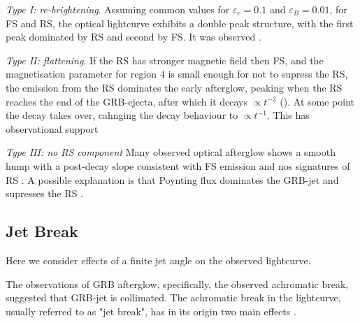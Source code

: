 \textit{Type I: re-brightening}. Assuming common values for $\varepsilon_e=0.1$ and $\varepsilon_B=0.01$, for FS and RS, the optical lightcurve exhibits a double peak structure, with the first peak dominated by RS and second by FS. It was observed \citep{Kobayashi and Zhang, 2003b; Shao and Dai, 2005}. 

\textit{Type II: flattening}. If the RS has stronger magnetic field then FS, and the magnetisation parameter for region $4$ is small enough for not to supress the RS, the emission from the RS dominates the early afterglow, peaking when the RS reaches the end of the GRB-ejecta, after which it decays $\propto t^{-2}$ (\citep{Meszaros and Rees, 1999; Sari and Piran, 1999b}). At some point the decay takes over, cahnging the decay behaviour to $\propto t^{-1}$. This has observational support \citep{(Fox et al., 2003; Li et al., 2003; Zhang et al., 2003a; Kumar and Panaitescu, 2003; Gomboc et al., 2008}

\textit{Type III: no RS component}
Many observed optical afterglow shows a smooth hump with a post-decay slope consistent with FS emission and nos signatures of RS \citep{Molinari et al., 2007; Ryko et al., 2009; Liang et al., 2010}.
A possible explanation is that Poynting flux dominates the GRB-jet and supresses the RS 
\citep{Zhang and Kobayashi, 2005; Mimica et al., 2009}.



\subsection{Jet Break}


Here we consider effects of a finite jet angle on the observed lightcurve.

The observations of GRB afterglow, specifically, the observed achromatic break, suggested that GRB-jet is collimated. The achromatic break in the lightcurve, usually referred to as "jet break", has in its origin two main effects \cite{Rhoads, 1999; Sari et al., 1999}. 

